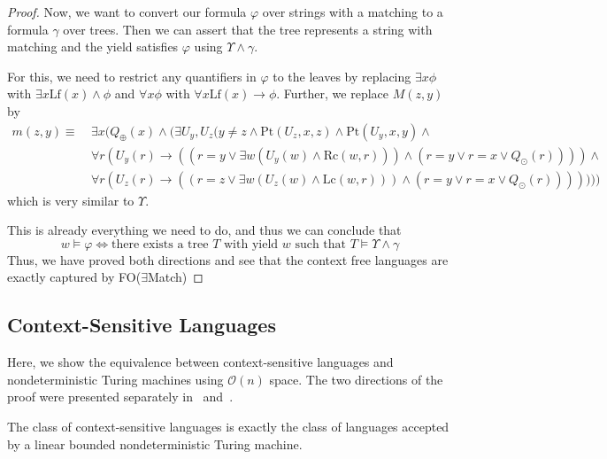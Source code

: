 \begin{proof}
    Now, we want to convert our formula $\varphi$ over strings with a matching to a formula $\gamma$ over trees.
    Then we can assert that the tree represents a string with matching and the yield satisfies $\varphi$ using $\Upsilon \land \gamma$.

    For this, we need to restrict any quantifiers in $\varphi$ to the leaves by replacing $\exists x \phi$ with $\exists x \text{Lf}(x) \land \phi$ and $\forall x \phi$ with $\forall x \text{Lf}(x) \to \phi$.
    Further, we replace $M(z, y)$ by
    \begin{align*}
        m(z, y) \equiv~& \exists x ( Q_{\oplus}(x) \land ( \exists U_y, U_z (y \neq z \land \text{Pt}(U_z, x, z) \land \text{Pt}(U_y, x, y) \land \\
        &\forall r (U_y(r) \to ((r = y \lor \exists w (U_y(w) \land \text{Rc}(w, r)))\land (r = y \lor r = x \lor Q_{\odot}(r)))) \land \\
        &\forall r (U_z(r) \to ((r = z \lor \exists w (U_z(w) \land \text{Lc}(w, r)))\land (r = y \lor r = x \lor Q_{\odot}(r)))))))
    \end{align*}
    which is very similar to $\Upsilon$.

    This is already everything we need to do, and thus we can conclude that
    \[w \models \varphi \Leftrightarrow \text{there exists a tree $T$ with yield $w$ such that } T \models \Upsilon \land \gamma \]
    Thus, we have proved both directions and see that the context free languages are exactly captured by FO($\exists$Match)
\end{proof}

\subsection{Context-Sensitive Languages}\label{subsec:des-context-sensitive-languages}

Here, we show the equivalence between context-sensitive languages and nondeterministic Turing machines using $\mathcal{O}(n)$ space.
The two directions of the proof were presented separately in~\cite{Kuroda1964} and~\cite{Landweber1963}.

\begin{theorem}
    \label{thm:nspacecontextsensitive}
    The class of context-sensitive languages is exactly the class of languages accepted by a linear bounded nondeterministic Turing machine.
\end{theorem}

